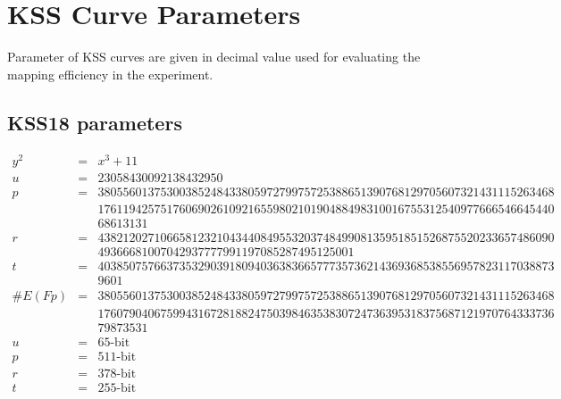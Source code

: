 \chapter{KSS Curve Parameters} %
\label{Appendix_IJNC}
\label{AppendixA}
Parameter of KSS curves are given in decimal value used for evaluating the mapping efficiency in the experiment.
\section{KSS18 parameters}
\label{appendix:KSS18}
\begin{eqnarray}
y^2 & = & x^3 + 11 \nonumber \\ 
u & = & 23058430092138432950 \nonumber \\ 
p & = &  3805560137530038524843380597279975725388651390768129705607321431115263468 \nonumber \\
& & 1761194257517606902610921655980210190488498310016755312540977666546645440 \nonumber \\
& & 68613131 \nonumber \\
r & = &  4382120271066581232104344084955320374849908135951851526875520233657486090 \nonumber \\
& &  49366681007042937777991197085287495125001 \nonumber \\
t & = &  4038507576637353290391809403638366577735736214369368538556957823117038873\nonumber \\
& & 9601\nonumber \\
\#E(Fp) & = &  3805560137530038524843380597279975725388651390768129705607321431115263468 \nonumber \\
& &  1760790406759943167281882475039846353830724736395318375687121970764333736 \nonumber \\
& & 79873531 \nonumber \\
u & = & 65\text{-bit}  \nonumber \\
p & = & 511\text{-bit}  \nonumber \\
r &  = & 378\text{-bit}  \nonumber \\
t & = & 255\text{-bit} \nonumber
\end{eqnarray}


